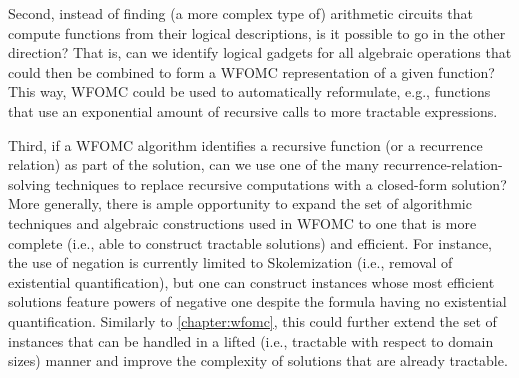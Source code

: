 Second, instead of finding (a more complex type of) arithmetic circuits that compute functions from their logical descriptions, is it possible to go in the other direction? That is, can we identify logical gadgets for all algebraic operations that could then be combined to form a WFOMC representation of a given function? This way, WFOMC could be used to automatically reformulate, e.g., functions that use an exponential amount of recursive calls to more tractable expressions.

Third, if a WFOMC algorithm identifies a recursive function (or a recurrence relation) as part of the solution, can we use one of the many recurrence-relation-solving techniques to replace recursive computations with a closed-form solution? More generally, there is ample opportunity to expand the set of algorithmic techniques and algebraic constructions used in WFOMC to one that is more complete (i.e., able to construct tractable solutions) and efficient. For instance, the use of negation is currently limited to Skolemization (i.e., removal of existential quantification), but one can construct instances whose most efficient solutions feature powers of negative one despite the formula having no existential quantification. Similarly to \cref{chapter:wfomc}, this could further extend the set of instances that can be handled in a lifted (i.e., tractable with respect to domain sizes) manner and improve the complexity of solutions that are already tractable.
